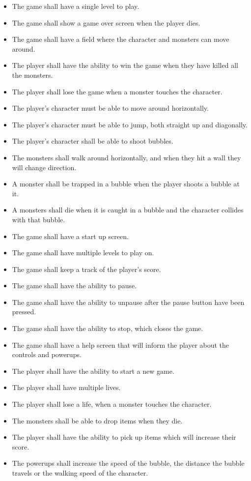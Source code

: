\begin{itemize}
    \item The game shall have a single level to play.
    \item The game shall show a game over screen when the player dies.
  \item The game shall have a field where the character and monsters can move around.
    \item The player shall have the ability to win the game when they have killed all the monsters.
  \item The player shall lose the game when a monster touches the character.
    \item The player's character must be able to move around horizontally.
    \item The player's character must be able to jump, both straight up and diagonally.
    \item The player's character shall be able to shoot bubbles.
    \item The monsters shall walk around horizontally, and when they hit a wall they will change direction. 
  \item A monster shall be trapped in a bubble when the player shoots a bubble at it.
  \item A monsters shall die when it is caught in a bubble and the character collides with that bubble.
   \item The game shall have a start up screen.
   \item The game shall have multiple levels to play on.
   \item The game shall keep a track of the player's score.
   \item The game shall have the ability to pause.
   \item The game shall have the ability to unpause after the pause button have been pressed.
   \item The game shall have the ability to stop, which closes the game.
   \item The game shall have a help screen that will inform the player about the controls and powerups.
   \item The player shall have the ability to start a new game.
   \item The player shall have multiple lives.
   \item The player shall lose a life, when a monster touches the character. 
   \item The monsters shall be able to drop items when they die.
   \item The player shall have the ability to pick up items which will increase their score.
   \item The powerups shall increase the speed of the bubble, the distance the bubble travels or the walking speed of the character.
\end{itemize}

